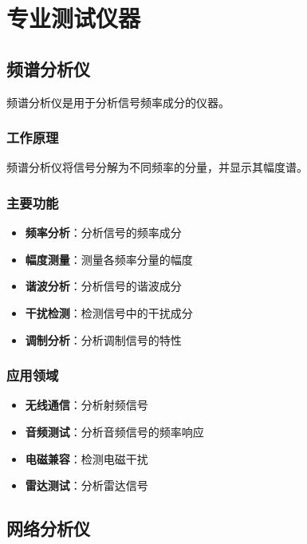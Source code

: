 
\chapter{专业测试仪器}
\label{chap:specialized_instruments}

\section{频谱分析仪}
\label{sec:spectrum_analyzer}

频谱分析仪是用于分析信号频率成分的仪器。

\subsection{工作原理}

频谱分析仪将信号分解为不同频率的分量，并显示其幅度谱。

\subsection{主要功能}
\begin{itemize}
    \item \textbf{频率分析}：分析信号的频率成分
    \item \textbf{幅度测量}：测量各频率分量的幅度
    \item \textbf{谐波分析}：分析信号的谐波成分
    \item \textbf{干扰检测}：检测信号中的干扰成分
    \item \textbf{调制分析}：分析调制信号的特性
\end{itemize}

\subsection{应用领域}
\begin{itemize}
    \item \textbf{无线通信}：分析射频信号
    \item \textbf{音频测试}：分析音频信号的频率响应
    \item \textbf{电磁兼容}：检测电磁干扰
    \item \textbf{雷达测试}：分析雷达信号
\end{itemize}

\section{网络分析仪}
\label{sec:network_analyzer}

